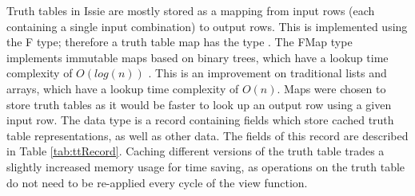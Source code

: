 Truth tables in Issie are mostly stored as a mapping from input rows (each containing a single input combination) to output rows. This is implemented using the F\fsharp {} type; therefore a truth table map has the type . The F\fsharp Map type implements immutable maps based on binary trees, which have a lookup time complexity of $O(log(n))$ \cite{fsmaps}. This is an improvement on traditional lists and arrays, which have a lookup time complexity of $O(n)$. Maps were chosen to store truth tables as it would be faster to look up an output row using a given input row.
The  data type is a record containing fields which store cached truth table representations, as well as other data. The fields of this record are described in Table \ref{tab:ttRecord}. Caching different versions of the truth table trades a slightly increased memory usage for time saving, as operations on the truth table do not need to be re-applied every cycle of the view function.

